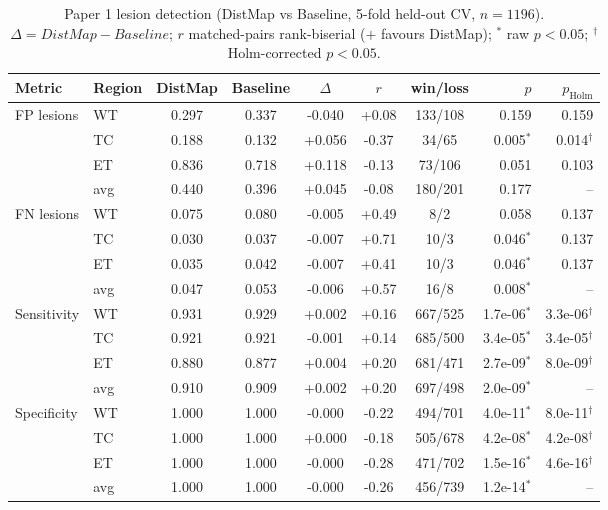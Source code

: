 \begin{table}[t]
\centering
\caption{Paper 1 lesion detection (DistMap vs Baseline, 5-fold held-out CV, $n=1196$). $\Delta=DistMap-Baseline$; $r$ matched-pairs rank-biserial ($+$ favours DistMap); $^{*}$ raw $p<0.05$; $^{\dagger}$ Holm-corrected $p<0.05$.}
\label{tab:p1_det}
\begin{tabular}{llcccccrr}
\toprule
Metric & Region & DistMap & Baseline & $\Delta$ & $r$ & win/loss & $p$ & $p_{\mathrm{Holm}}$ \\
\midrule
\multirow{4}{*}{FP lesions} & WT & 0.297 & 0.337 & -0.040 & +0.08 & 133/108 & 0.159 & 0.159 \\
 & TC & 0.188 & 0.132 & +0.056 & -0.37 & 34/65 & 0.005$^{*}$ & 0.014$^{\dagger}$ \\
 & ET & 0.836 & 0.718 & +0.118 & -0.13 & 73/106 & 0.051 & 0.103 \\
 & avg & 0.440 & 0.396 & +0.045 & -0.08 & 180/201 & 0.177 & -- \\
\midrule
\multirow{4}{*}{FN lesions} & WT & 0.075 & 0.080 & -0.005 & +0.49 & 8/2 & 0.058 & 0.137 \\
 & TC & 0.030 & 0.037 & -0.007 & +0.71 & 10/3 & 0.046$^{*}$ & 0.137 \\
 & ET & 0.035 & 0.042 & -0.007 & +0.41 & 10/3 & 0.046$^{*}$ & 0.137 \\
 & avg & 0.047 & 0.053 & -0.006 & +0.57 & 16/8 & 0.008$^{*}$ & -- \\
\midrule
\multirow{4}{*}{Sensitivity} & WT & 0.931 & 0.929 & +0.002 & +0.16 & 667/525 & 1.7e-06$^{*}$ & 3.3e-06$^{\dagger}$ \\
 & TC & 0.921 & 0.921 & -0.001 & +0.14 & 685/500 & 3.4e-05$^{*}$ & 3.4e-05$^{\dagger}$ \\
 & ET & 0.880 & 0.877 & +0.004 & +0.20 & 681/471 & 2.7e-09$^{*}$ & 8.0e-09$^{\dagger}$ \\
 & avg & 0.910 & 0.909 & +0.002 & +0.20 & 697/498 & 2.0e-09$^{*}$ & -- \\
\midrule
\multirow{4}{*}{Specificity} & WT & 1.000 & 1.000 & -0.000 & -0.22 & 494/701 & 4.0e-11$^{*}$ & 8.0e-11$^{\dagger}$ \\
 & TC & 1.000 & 1.000 & +0.000 & -0.18 & 505/678 & 4.2e-08$^{*}$ & 4.2e-08$^{\dagger}$ \\
 & ET & 1.000 & 1.000 & -0.000 & -0.28 & 471/702 & 1.5e-16$^{*}$ & 4.6e-16$^{\dagger}$ \\
 & avg & 1.000 & 1.000 & -0.000 & -0.26 & 456/739 & 1.2e-14$^{*}$ & -- \\
\midrule
\bottomrule
\end{tabular}
\end{table}
